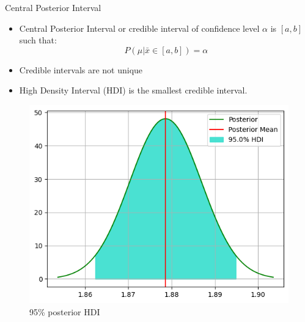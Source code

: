 \begin{frame}{Central Posterior Interval}

\begin{itemize}
  \item Central Posterior Interval or credible interval of confidence level $\alpha$ is $[a, b]$ such that:
  \[ P(\mu | \bar{x} \in [a, b]) = \alpha \]
  \item Credible intervals are not unique
  \item High Density Interval (HDI) is the smallest credible interval.
\end{itemize}

\begin{figure}
  \centering
  \includegraphics[width=.6\textwidth]{Project1/Report/images/hdi.png}
  \caption{95\% posterior HDI}
\end{figure}
  
\end{frame}

